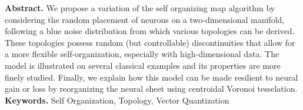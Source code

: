 
\maketitle

\noindent\textbf{Abstract.} We propose a variation of the self organizing map
algorithm by considering the random placement of neurons on a two-dimensional
manifold, following a blue noise distribution from which various topologies can
be derived. These topologies possess random (but controllable) discontinuities
that allow for a more flexible self-organization, especially with
high-dimensional data. The model is illustrated on several classical examples
and its properties are more finely studied. Finally, we explain how this model
can be made resilient to neural gain or loss by reorganizing the neural sheet
using centroidal Voronoi tesselation.\\

\noindent\textbf{Keywords.} Self Organization, Topology, Vector Quantization

\bigskip
